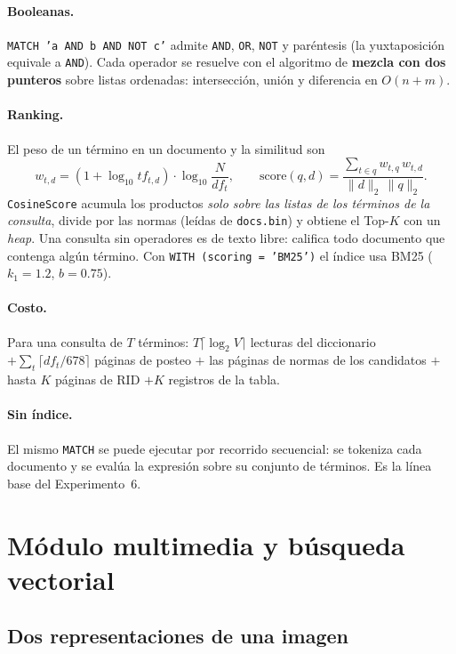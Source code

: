 \documentclass[11pt,a4paper]{article}
\newcommand{\code}[1]{\texttt{#1}}
\begin{document}
\paragraph{Booleanas.} \code{MATCH 'a AND b AND NOT c'} admite \code{AND}, \code{OR}, \code{NOT} y
paréntesis (la yuxtaposición equivale a \code{AND}). Cada operador se resuelve con el algoritmo de
\textbf{mezcla con dos punteros} sobre listas ordenadas: intersección, unión y diferencia en
$O(n+m)$.

\paragraph{Ranking.} El peso de un término en un documento y la similitud son
\[
w_{t,d}=(1+\log_{10} tf_{t,d})\cdot\log_{10}\frac{N}{df_t},\qquad
\text{score}(q,d)=\frac{\sum_{t\in q} w_{t,q}\,w_{t,d}}{\lVert d\rVert_2\,\lVert q\rVert_2}.
\]
\code{CosineScore} acumula los productos \emph{solo sobre las listas de los términos de la consulta},
divide por las normas (leídas de \code{docs.bin}) y obtiene el Top-$K$ con un \emph{heap}. Una
consulta sin operadores es de texto libre: califica todo documento que contenga algún término. Con
\code{WITH (scoring = 'BM25')} el índice usa BM25 ($k_1=1.2$, $b=0.75$).

\paragraph{Costo.} Para una consulta de $T$ términos: $T\lceil\log_2 V\rceil$ lecturas del
diccionario $+ \sum_t \lceil df_t/678\rceil$ páginas de posteo $+$ las páginas de normas de los
candidatos $+$ hasta $K$ páginas de RID $+ K$ registros de la tabla.

\paragraph{Sin índice.} El mismo \code{MATCH} se puede ejecutar por recorrido secuencial: se
tokeniza cada documento y se evalúa la expresión sobre su conjunto de términos. Es la línea base del
Experimento~6.

\section{Módulo multimedia y búsqueda vectorial}
\label{sec:vector}

\subsection{Dos representaciones de una imagen}
\end{document}
